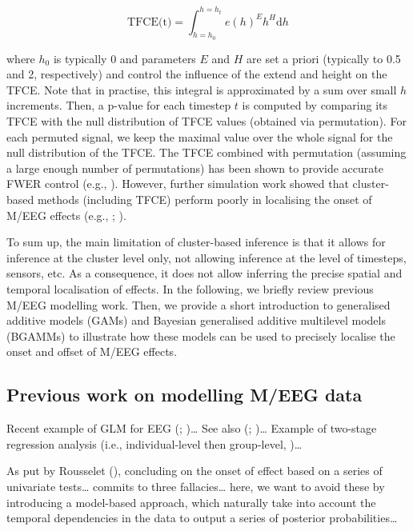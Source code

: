 \documentclass[
  doc,
  floatsintext,
  longtable,
  a4paper,
  nolmodern,
  notxfonts,
  notimes,
  donotrepeattitle,
  colorlinks=true,linkcolor=blue,citecolor=blue,urlcolor=blue]{apa7}
\begin{document}
\[
\text{TFCE(t)} = \int_{h=h_{0}}^{h=h_{t}} e(h)^{E} h^{H} \mathrm{d}h
\]

where \(h_{0}\) is typically \(0\) and parameters \(E\) and \(H\) are
set a priori (typically to 0.5 and 2, respectively) and control the
influence of the extend and height on the TFCE. Note that in practise,
this integral is approximated by a sum over small \(h\) increments.
Then, a p-value for each timestep \(t\) is computed by comparing its
TFCE with the null distribution of TFCE values (obtained via
permutation). For each permuted signal, we keep the maximal value over
the whole signal for the null distribution of the TFCE. The TFCE
combined with permutation (assuming a large enough number of
permutations) has been shown to provide accurate FWER control (e.g.,
). However, further
simulation work showed that cluster-based methods (including TFCE)
perform poorly in localising the onset of M/EEG effects (e.g.,
;
).

To sum up, the main limitation of cluster-based inference is that it
allows for inference at the cluster level only, not allowing inference
at the level of timesteps, sensors, etc. As a consequence, it does not
allow inferring the precise spatial and temporal localisation of
effects. In the following, we briefly review previous M/EEG modelling
work. Then, we provide a short introduction to generalised additive
models (GAMs) and Bayesian generalised additive multilevel models
(BGAMMs) to illustrate how these models can be used to precisely
localise the onset and offset of M/EEG effects.

\subsection{Previous work on modelling M/EEG
data}\label{previous-work-on-modelling-meeg-data}

Recent example of GLM for EEG (; )\ldots{} See also (;
)\ldots{} Example of
two-stage regression analysis (i.e., individual-level then group-level,
)\ldots{}

As put by Rousselet (),
concluding on the onset of effect based on a series of univariate
tests\ldots{} commits to three fallacies\ldots{} here, we want to avoid
these by introducing a model-based approach, which naturally take into
account the temporal dependencies in the data to output a series of
posterior probabilities\ldots{}
\end{document}

